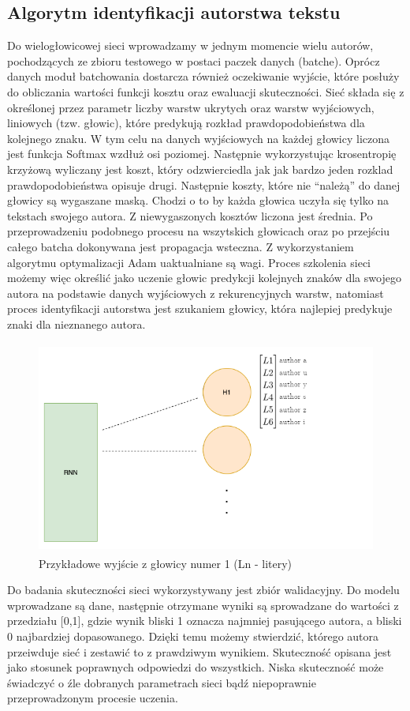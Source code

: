 \subsection{Algorytm identyfikacji autorstwa tekstu}

Do wielogłowicowej sieci wprowadzamy w jednym momencie wielu autorów, pochodzących ze zbioru 
testowego w postaci paczek danych (batche). Oprócz danych moduł batchowania dostarcza również 
oczekiwanie wyjście, które posłuży do obliczania wartości funkcji kosztu oraz ewaluacji skuteczności. 
Sieć składa się z określonej przez parametr liczby warstw ukrytych oraz warstw wyjściowych, 
liniowych (tzw. głowic), które predykują rozkład prawdopodobieństwa dla kolejnego znaku. 
W tym celu na danych wyjściowych na każdej głowicy liczona jest funkcja Softmax wzdłuż osi poziomej. 
Następnie wykorzystując
krosentropię krzyżową wyliczany jest koszt, który odzwierciedla jak jak bardzo jeden rozklad 
prawdopodobieństwa opisuje drugi. Następnie koszty, które nie ``należą'' do danej głowicy są wygaszane maską. Chodzi o to by 
każda głowica uczyła się tylko na tekstach swojego autora. Z niewygaszonych kosztów liczona jest średnia.
Po przeprowadzeniu podobnego procesu na wszytskich głowicach oraz po przejściu całego batcha
 dokonywana jest propagacja wsteczna. 
Z wykorzystaniem algorytmu optymalizacji Adam uaktualniane są wagi. Proces szkolenia sieci
możemy więc określić jako uczenie głowic predykcji kolejnych znaków dla swojego autora na podstawie
danych wyjściowych z rekurencyjnych warstw, natomiast proces identyfikacji autorstwa jest szukaniem głowicy, 
która najlepiej predykuje znaki dla nieznanego autora.

\begin{figure}[H]
\centering
\includegraphics[height=7cm]{./images/rnn-output-2.png}
\caption{Przykładowe wyjście z głowicy numer 1 (Ln - litery)}
\label{fig:test5}
\end{figure} 

Do badania skuteczności sieci wykorzystywany jest zbiór walidacyjny. Do modelu wprowadzane są dane, 
następnie otrzymane wyniki są sprowadzane do wartości z przedziału [0,1], 
gdzie wynik bliski 1 oznacza najmniej pasującego autora, a bliski 0 najbardziej dopasowanego.
Dzięki temu możemy stwierdzić, którego autora przeiwduje sieć i zestawić to z prawdziwym wynikiem.
Skuteczność opisana jest jako stosunek poprawnych odpowiedzi do wszystkich. Niska skuteczność może 
świadczyć o źle dobranych parametrach sieci bądź niepoprawnie przeprowadzonym procesie uczenia.